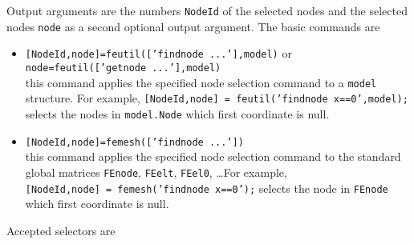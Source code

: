 Output arguments are the numbers {\tt NodeId} of the selected nodes and the selected nodes {\tt node} as a second optional output argument. The basic commands are  
\begin{itemize}
\item {\tt [NodeId,node]=feutil(['findnode ...'],model)} or {\tt node=feutil(['getnode ...'],model)}\\
this command applies the specified node selection command to a {\tt model} structure. For example,
{\tt [NodeId,node] = feutil('findnode x==0',model);} \\selects the nodes in {\tt model.Node} which first coordinate is null.

\item {\tt [NodeId,node]=femesh(['findnode ...'])}\\
this command applies the specified node selection command to the standard global matrices {\tt FEnode}, {\tt FEelt}, {\tt FEel0}, \ldots For example,\\
{\tt [NodeId,node] = femesh('findnode x==0');}
selects the node in {\tt FEnode} which first coordinate is null.
\end{itemize}

Accepted selectors are

